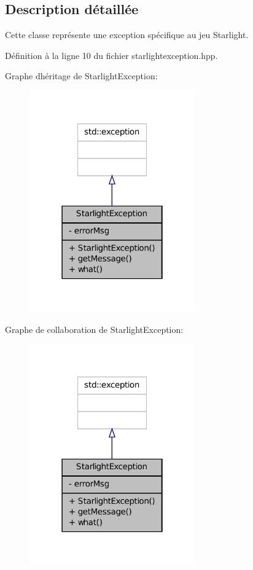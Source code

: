 \subsection{Description détaillée}
Cette classe représente une exception spécifique au jeu Starlight. 

Définition à la ligne 10 du fichier starlightexception.\+hpp.



Graphe d\textquotesingle{}héritage de Starlight\+Exception\+:\nopagebreak
\begin{figure}[H]
\begin{center}
\leavevmode
\includegraphics[width=202pt]{da/dcd/classStarlightException__inherit__graph}
\end{center}
\end{figure}


Graphe de collaboration de Starlight\+Exception\+:\nopagebreak
\begin{figure}[H]
\begin{center}
\leavevmode
\includegraphics[width=202pt]{dd/d88/classStarlightException__coll__graph}
\end{center}
\end{figure}


